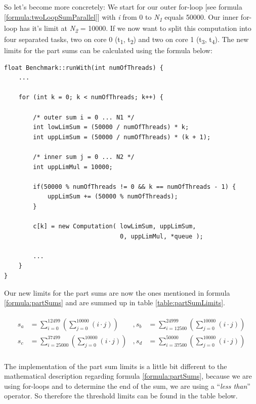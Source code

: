 \noindent So let's become more concretely: We start for our outer for-loop [see formula \ref{formula:twoLoopSumParallel}] with \textit{i} from 0 to \textit{N\textsubscript{1}} equals 50000. Our inner for-loop has it's limit at \textit{N\textsubscript{2}} = 10000. If we now want to split this computation into four separated tasks, two on core 0 (t\textsubscript{1}, t\textsubscript{2}) and two on core 1 (t\textsubscript{3}, t\textsubscript{4}). The new limits for the part sums can be calculated using the formula below:

\begin{lstlisting}[label={code:calcLimits}]
float Benchmark::runWith(int numOfThreads) {
	...
	
	for (int k = 0; k < numOfThreads; k++) {
	
		/* outer sum i = 0 ... N1 */
		int lowLimSum = (50000 / numOfThreads) * k;
		int uppLimSum = (50000 / numOfThreads) * (k + 1);
		
		/* inner sum j = 0 ... N2 */
		int uppLimMul = 10000;
		
		if(50000 % numOfThreads != 0 && k == numOfThreads - 1) {
			uppLimSum += (50000 % numOfThreads);
		}
	
		c[k] = new Computation(	lowLimSum, uppLimSum, 
								0, uppLimMul, *queue );
	
		...
	}
}
\end{lstlisting}

Our new limits for the part sums are now the ones mentioned in formula \ref{formula:partSums} and are summed up in table \ref{table:partSumLimits}.

\newpage

\begin{align} \label{formula:partSums}
\begin{aligned}
	s_a &= \sum_{i = 0}^{12499} \left( \sum_{j = 0}^{10000} \left(i \cdot j\right) \right) &, 
	s_b &= \sum_{i = 12500}^{24999} \left( \sum_{j = 0}^{10000} \left(i \cdot j\right) \right) \\
	s_c &= \sum_{i = 25000}^{37499} \left( \sum_{j = 0}^{10000} \left(i \cdot j\right) \right) &, 
	s_d &= \sum_{i = 37500}^{50000} \left( \sum_{j = 0}^{10000} \left(i \cdot j\right) \right)
\end{aligned}
\end{align}\\

\noindent The implementation of the part sum limits is a little bit different to the mathematical description regarding formula \ref{formula:partSums}, because we are using for-loops and to determine the end of the sum, we are using a ``\textit{less than}'' operator. So therefore the threshold limits can be found in the table below.

